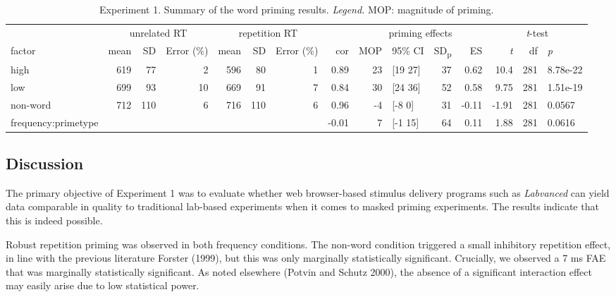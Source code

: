 \documentclass[
]{interact}
\newcommand{\blandscape}{\begin{landscape}}
\newcommand{\elandscape}{\end{landscape}}
\begin{document}
\blandscape

\begin{longtable}{lrrrrrrrrlrrrrl}

\caption{\label{tbl-exp1-statsResults}Experiment 1. Summary of the word
priming results. \emph{Legend.} MOP: magnitude of priming.}

\tabularnewline

\toprule
 & \multicolumn{3}{c}{unrelated RT} & \multicolumn{3}{c}{repetition RT} &  & \multicolumn{4}{c}{priming effects} & \multicolumn{3}{c}{\emph{t}-test} \\ 
\cmidrule(lr){2-4} \cmidrule(lr){5-7} \cmidrule(lr){9-12} \cmidrule(lr){13-15}
factor & mean & SD & Error (\%) & mean & SD & Error (\%) & cor & MOP & 95\% CI & SD\textsubscript{p} & ES & \emph{t} & df & \emph{p} \\ 
\midrule\addlinespace[2.5pt]
high & 619 & 77 & 2 & 596 & 80 & 1 & 0.89 & 23 & [19 27] & 37 & 0.62 & 10.4 & 281 & 8.78e-22 \\ 
low & 699 & 93 & 10 & 669 & 91 & 7 & 0.84 & 30 & [24 36] & 52 & 0.58 & 9.75 & 281 & 1.51e-19 \\ 
non-word & 712 & 110 & 6 & 716 & 110 & 6 & 0.96 & -4 & [-8 0] & 31 & -0.11 & -1.91 & 281 & 0.0567 \\ 
frequency:primetype &   &   &   &   &   &   & -0.01 & 7 & [-1 15] & 64 & 0.11 & 1.88 & 281 & 0.0616 \\ 
\bottomrule

\end{longtable}

\elandscape

\subsection{Discussion}\label{sec-exp1-discussion}

The primary objective of Experiment 1 was to evaluate whether web
browser-based stimulus delivery programs such as \emph{Labvanced} can
yield data comparable in quality to traditional lab-based experiments
when it comes to masked priming experiments. The results indicate that
this is indeed possible.

Robust repetition priming was observed in both frequency conditions. The
non-word condition triggered a small inhibitory repetition effect, in
line with the previous literature Forster (1999), but this was only
marginally statistically significant. Crucially, we observed a 7 ms FAE
that was marginally statistically significant. As noted elsewhere
(Potvin and Schutz 2000), the absence of a significant interaction
effect may easily arise due to low statistical power.
\end{document}
